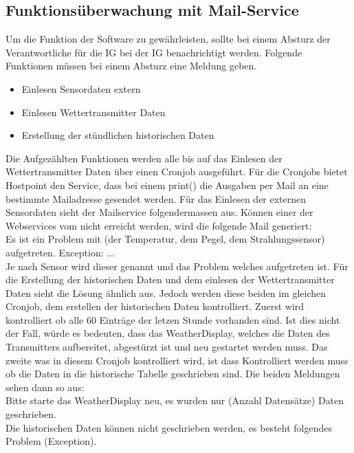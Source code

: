 
\subsection{Funktionsüberwachung mit Mail-Service}

Um die Funktion der Software zu gewährleisten, sollte bei einem Absturz der Verantwortliche für die IG bei der IG benachrichtigt werden. Folgende Funktionen müssen bei einem Absturz eine Meldung geben.
\begin{itemize}
\item Einlesen Sensordaten extern
\item Einlesen Wettertransmitter Daten
\item Erstellung der stündlichen historischen Daten
\end{itemize}
Die Aufgezählten Funktionen werden alle bis auf das Einlesen der Wettertransmitter Daten über einen Cronjob ausgeführt. Für die Cronjobs bietet Hostpoint den Service, dass bei einem print() die Ausgaben per Mail an eine bestimmte Mailadresse gesendet werden. Für das Einlesen der externen Sensordaten sieht der Mailservice folgendermassen aus. Können einer der Webservices vom  nicht erreicht werden, wird die folgende Mail generiert:\\
Es ist ein Problem mit (der Temperatur, dem Pegel, dem Strahlungssensor) aufgetreten. Exception: ...\\
Je nach Sensor wird dieser genannt und das Problem welches aufgetreten ist. Für die Erstellung der historischen Daten und dem einlesen der Wettertransmitter Daten sieht die Lösung ähnlich aus. Jedoch werden diese beiden im gleichen Cronjob, dem erstellen der historischen Daten kontrolliert. Zuerst wird kontrolliert ob alle 60 Einträge der letzen Stunde vorhanden sind. Ist dies nicht der Fall, würde es bedeuten, dass das WeatherDisplay, welches die Daten des Transmitters aufbereitet, abgestürzt ist und neu gestartet werden muss. Das zweite was in diesem Cronjob kontrolliert wird, ist dass Kontrolliert werden muss ob die Daten in die historische Tabelle geschrieben sind. Die beiden Meldungen sehen dann so aus:\\
Bitte starte das WeatherDisplay neu, es wurden nur (Anzahl Datensätze) Daten geschrieben.\\
Die historischen Daten können nicht geschrieben werden, es besteht folgendes Problem (Exception).\\

